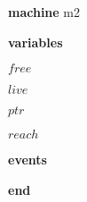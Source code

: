 \begin{block}
  \item   \textbf{machine} m2
  \item   \textbf{variables}
  \begin{block}
    \item   $free$
    \item   $live$
    \item   $ptr$
    \item   $reach$
  \end{block}
  \item   
  \item   \textbf{events}
  \begin{block}
    \item   
    \item   
    \item   
    \item   
  \end{block}
  \item   \textbf{end} \\
\end{block}

